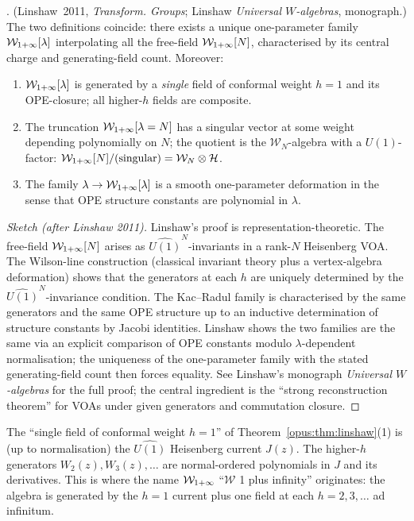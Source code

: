 \begin{theorem}
\label{opus:thm:linshaw}
\ClaimStatusTheorem. (Linshaw~2011, \emph{Transform. Groups}; Linshaw \emph{Universal
$W$-algebras}, monograph.) The two definitions coincide: there exists a unique
one-parameter family $\mathcal{W}_{1+\infty}[\lambda]$ interpolating all the free-field $\mathcal{W}_{1+\infty}[N]$,
characterised by its central charge and generating-field count. Moreover:
\begin{enumerate}
\item $\mathcal{W}_{1+\infty}[\lambda]$ is generated by a \emph{single} field of conformal weight $h = 1$
and its OPE-closure; all higher-$h$ fields are composite.
\item The truncation $\mathcal{W}_{1+\infty}[\lambda = N]$ has a singular vector at some weight
depending polynomially on $N$; the quotient is the $\mathcal{W}_N$-algebra with
a $U(1)$-factor: $\mathcal{W}_{1+\infty}[N] / \text{(singular)} = \mathcal{W}_N \otimes \mathcal{H}$.
\item The family $\lambda \to \mathcal{W}_{1+\infty}[\lambda]$ is a smooth one-parameter deformation
in the sense that OPE structure constants are polynomial in $\lambda$.
\end{enumerate}
\end{theorem}

\begin{proof}[Sketch (after Linshaw 2011)]
Linshaw's proof is representation-theoretic. The free-field $\mathcal{W}_{1+\infty}[N]$ arises as
$\widehat{U(1)}^N$-invariants in a rank-$N$ Heisenberg VOA. The Wilson-line construction
(classical invariant theory plus a vertex-algebra deformation) shows that the
generators at each $h$ are uniquely determined by the $\widehat{U(1)}^N$-invariance
condition. The Kac--Radul family is characterised by the same generators and the same
OPE structure up to an inductive determination of structure constants by Jacobi
identities. Linshaw shows the two families are the same via an explicit comparison of
OPE constants modulo $\lambda$-dependent normalisation; the uniqueness of the
one-parameter family with the stated generating-field count then forces equality.
See Linshaw's monograph \emph{Universal $W$-algebras} for the full proof; the central
ingredient is the ``strong reconstruction theorem'' for VOAs under given generators
and commutation closure.
\end{proof}

\begin{remark}
\label{opus:rem:conformal-weight-one}
The ``single field of conformal weight $h = 1$'' of Theorem~\ref{opus:thm:linshaw}(1)
is (up to normalisation) the $\widehat{U(1)}$ Heisenberg current $J(z)$. The higher-$h$
generators $W_2(z), W_3(z), \ldots$ are normal-ordered polynomials in $J$ and its
derivatives. This is where the name $\mathcal{W}_{1+\infty}$ ``$\mathcal{W}$ 1 plus infinity''
originates: the algebra is generated by the $h = 1$ current plus one field at each
$h = 2, 3, \ldots$ ad infinitum.
\end{remark}

